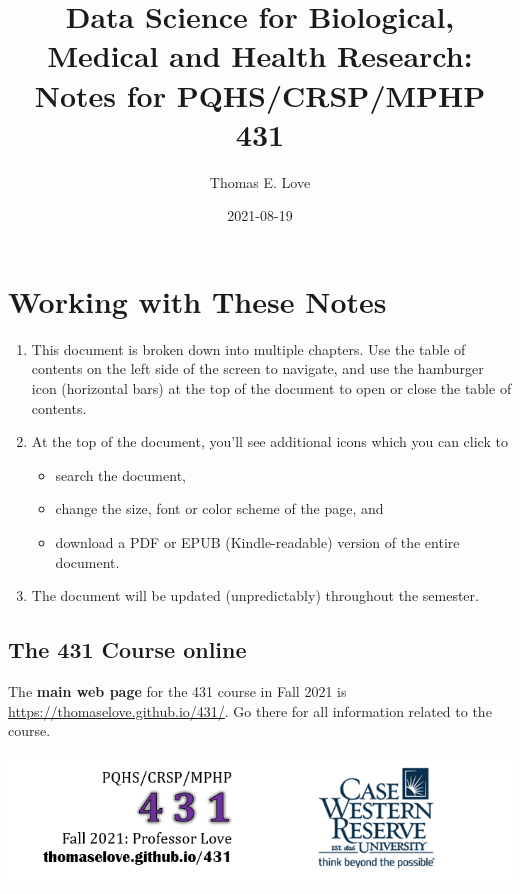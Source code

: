 \documentclass[
]{book}
\title{Data Science for Biological, Medical and Health Research: Notes for PQHS/CRSP/MPHP 431}
\author{Thomas E. Love}
\date{2021-08-19}
\providecommand{\tightlist}{%
  \setlength{\itemsep}{0pt}\setlength{\parskip}{0pt}}
\begin{document}
\maketitle

{
\setcounter{tocdepth}{1}
\tableofcontents
}
\hypertarget{working-with-these-notes}{%
\chapter*{Working with These Notes}\label{working-with-these-notes}}

\begin{enumerate}
\def\labelenumi{\arabic{enumi}.}
\tightlist
\item
  This document is broken down into multiple chapters. Use the table of contents on the left side of the screen to navigate, and use the hamburger icon (horizontal bars) at the top of the document to open or close the table of contents.
\item
  At the top of the document, you'll see additional icons which you can click to

  \begin{itemize}
  \tightlist
  \item
    search the document,
  \item
    change the size, font or color scheme of the page, and
  \item
    download a PDF or EPUB (Kindle-readable) version of the entire document.
  \end{itemize}
\item
  The document will be updated (unpredictably) throughout the semester.
\end{enumerate}

\hypertarget{the-431-course-online}{%
\section*{The 431 Course online}\label{the-431-course-online}}

The \textbf{main web page} for the 431 course in Fall 2021 is \url{https://thomaselove.github.io/431/}. Go there for all information related to the course.

\begin{center}\includegraphics[width=0.8\linewidth]{figures/431_foot2} \end{center}
\end{document}
